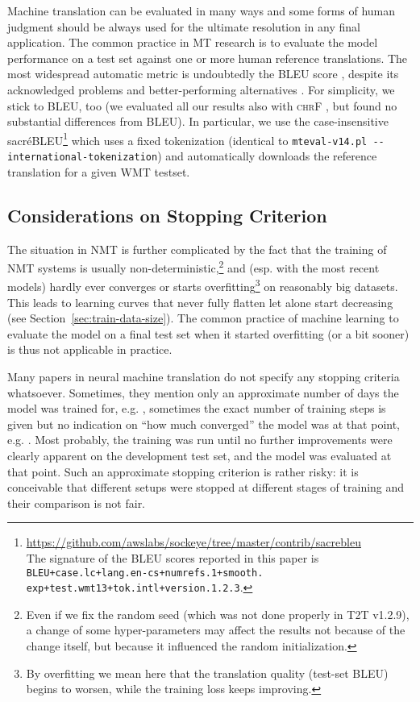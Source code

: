 \documentclass{pbmlarxiv} \pdfoutput=1
\def\Sref#1{Section~\ref{#1}}
\def\perscite#1{\citet{#1}}
\def\parcite#1{\cite{#1}}
\begin{document}
Machine translation can be evaluated in many ways and some forms of human
judgment should be always used for the ultimate resolution in any final
application. The common practice in MT research is to evaluate the model performance on a test
set against one or more human reference translations. The most widespread
automatic metric is undoubtedly the BLEU score \parcite{papineni:2002}, despite
its acknowledged problems and better-performing alternatives
\parcite{bojar-graham-kamran:2017:WMT}.
For simplicity, we stick to BLEU, too
 (we evaluated all our results also with \textsc{chrF} \citep{popovic-2015},
  but found no substantial differences from BLEU).
In particular, we use the case-insensitive
sacréBLEU\footnote{
 \url{https://github.com/awslabs/sockeye/tree/master/contrib/sacrebleu}\\
 The signature of the BLEU scores reported in this paper is
 \texttt{BLEU+case.lc+lang.en-cs+numrefs.1+smooth. exp+test.wmt13+tok.intl+version.1.2.3}.
} which uses a fixed tokenization 
(identical to \texttt{mteval-v14.pl -{}-in\-ter\-na\-tional-tok\-en\-i\-za\-tion})
and automatically downloads the reference translation for a given WMT testset.

\subsection{Considerations on Stopping Criterion}
The situation in NMT is further complicated by the fact
 that the training of NMT systems is usually non-deterministic,\footnote{
  Even if we fix the random seed (which was not done properly in T2T v1.2.9),
   a change of some hyper-parameters may affect the results
   not because of the change itself, but because it influenced the random initialization.
 }
 and (esp. with the most recent models) hardly ever converges
 or starts overfitting\footnote{
  By overfitting we mean here that the translation quality (test-set BLEU) begins to worsen,
   while the training loss keeps improving.
 } on reasonably big datasets.
This leads to learning curves that never fully flatten let alone start
 decreasing (see \Sref{sec:train-data-size}).
The common practice of machine learning to evaluate the model on a final test set
 when it started overfitting (or a bit sooner) is thus not applicable in practice.
 
Many papers in neural machine translation do not specify any stopping criteria
whatsoever. Sometimes, they mention only an approximate number of days the model
was trained for, e.g. \perscite{bahdanau:etal:attention:iclr:2015}, sometimes
the exact number of training steps is given but no indication on ``how much
converged'' the model was at that point, e.g. \perscite{vaswani-et-al:2017}.
Most probably, the training was run 
until no further improvements were clearly apparent on the development test set,
and the model was evaluated at that point.
Such an approximate stopping criterion is rather risky: it is conceivable
that different setups were stopped at different stages of training and their
comparison is not fair.
\end{document}
